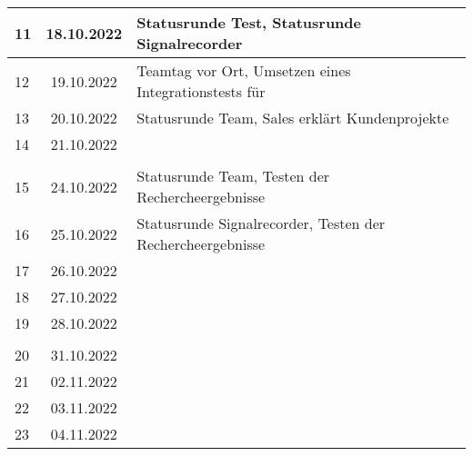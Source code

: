 \begin{longtable}{|l|c|l|}
11  & 18.10.2022    & Statusrunde Test, Statusrunde Signalrecorder                                                      \\ \hline   
12  & 19.10.2022    & Teamtag vor Ort, Umsetzen eines Integrationstests für                                                       \\ \hline   
13  & 20.10.2022    & Statusrunde Team, Sales erklärt Kundenprojekte                                                      \\ \hline   
14  & 21.10.2022    &                                                       \\ \hline  
    &               &                                                       \\ \hline 
15  & 24.10.2022    & Statusrunde Team, Testen der Rechercheergebnisse                                                   \\ \hline   
16  & 25.10.2022    & Statusrunde Signalrecorder, Testen der Rechercheergebnisse                                                      \\ \hline   
17  & 26.10.2022    &                                                       \\ \hline   
18  & 27.10.2022    &                                                       \\ \hline   
19  & 28.10.2022    &                                                       \\ \hline 
    &               &                                                       \\ \hline
20  & 31.10.2022    &                                                       \\ \hline   
21  & 02.11.2022    &                                                       \\ \hline   
22  & 03.11.2022    &                                                       \\ \hline   
23  & 04.11.2022    &                                                       \\ \hline 


\end{longtable}

